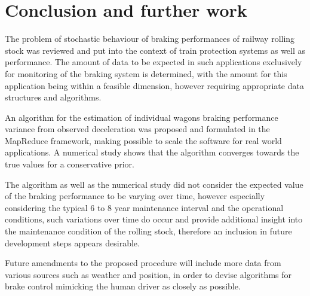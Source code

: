 \documentclass[a4paper, 12pt]{scrartcl}
\begin{document}
\section{Conclusion and further work}
The problem of stochastic behaviour of braking performances of railway rolling stock was reviewed and put into the context of train protection systems as well as performance. The amount of data to be expected in such applications exclusively for monitoring of the braking system is determined, with the amount for this application being within a feasible dimension, however requiring appropriate data structures and algorithms.

An algorithm for the estimation of individual wagons braking performance variance from observed deceleration was proposed and formulated in the MapReduce framework, making possible to scale the software for real world applications. A numerical study shows that the algorithm converges towards the true values for a conservative prior.

The algorithm as well as the numerical study did not consider the expected value of the braking performance to be varying over time, however especially considering the typical 6 to 8 year maintenance interval and the operational conditions, such variations over time do occur and provide additional insight into the maintenance condition of the rolling stock, therefore an inclusion in future development steps appears desirable.

Future amendments to the proposed procedure will include more data from various sources such as weather and position, in order to devise algorithms for brake control mimicking the human driver as closely as possible.




\end{document}

